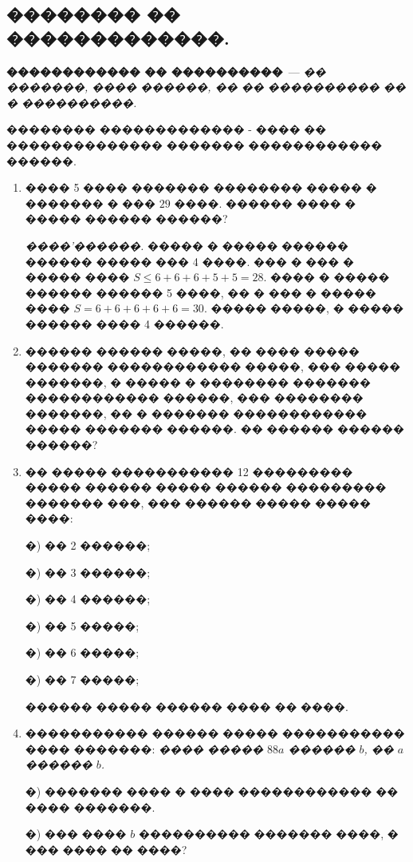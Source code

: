 \documentclass[a4paper,12pt]{article}
\begin{document}





\begin{center}
\section*{�������� �� �������������.}
\end{center}

\textbf{������������ �� ����������}~--- \textit{�� �������, ���� ������, �� �� ���������� �� � ����������.}

�������� ������������� - ���� �� �������������� ������� ������������ ������.

\medskip\medskip\medskip

\begin{enumerate}
\item ���� 5 ���� ������� �������� ����� � ������� � ��� $29$ ����. ������ ���� � ����� ������ ������?

\textit{����'������.} ����� � ����� ������ ������ ����� ��� 4 ����. ��� � ��� � ����� ���� $S\leq 6 + 6+ 6+ 5+ 5 = 28$. ���� � ����� ������ ������ 5 ����, �� � ��� � ����� ���� $S = 6+6+6+6+6=30$. ����� �����, � ����� ������ ���� 4 ������.

\item ������ ������ �����, �� ���� ����� ������� ������������ �����, ��� ����� �������, � ����� � �������� ������� ������������ ������, ��� �������� �������, �� � ������� ������������ ����� ������� ������. �� ������ ������ ������?

\item �� ����� ����������� 12 ��������� ����� ������ ����� ������ ��������� ������� ���, ��� ������ ����� ����� ����:

    �) �� 2 ������;

    �) �� 3 ������;

    �) �� 4 ������;

    �) �� 5 �����;

    �) �� 6 �����;

    �) �� 7 �����;

 ������ ����� ������ ���� �� ����.


\item ����������� ������ ����� ����������� ���� �������: \textit{���� ����� $88a$ ������ $b$, �� $a$ ������ $b$.}

    �) ������� ���� � ���� ������������ �� ���� �������.

    �) ��� ���� $b$ ���������� ������� ����, � ��� ���� �� ����?


\end{enumerate}
\end{document}
